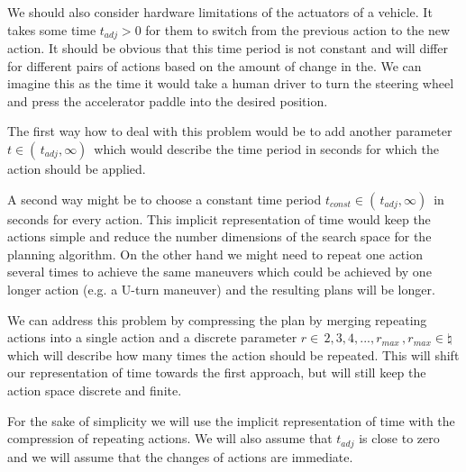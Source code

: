 We should also consider hardware limitations of the actuators of a vehicle. It takes some time $t_{adj} > 0$ for them to switch from the previous action to the new action. It should be obvious that this time period is not constant and will differ for different pairs of actions based on the amount of change in the. We can imagine this as the time it would take a human driver to turn the steering wheel and press the accelerator paddle into the desired position.

The first way how to deal with this problem would be to add another parameter $t \in ( \, t_{adj}, \infty ) \,$ which would describe the time period in seconds for which the action should be applied.

A second way might be to choose a constant time period $t_{const} \in ( \, t_{adj}, \infty ) \,$ in seconds for every action. This implicit representation of time would keep the actions simple and reduce the number dimensions of the search space for the planning algorithm. On the other hand we might need to repeat one action several times to achieve the same maneuvers which could be achieved by one longer action (e.g. a U-turn maneuver) and the resulting plans will be longer.

We can address this problem by compressing the plan by merging repeating actions into a single action and a discrete parameter $r \in { \, 2, 3, 4, ..., r_{max} } \,, r_{max} \in \natural$ which will describe how many times the action should be repeated. This will shift our representation of time towards the first approach, but will still keep the action space discrete and finite.

For the sake of simplicity we will use the implicit representation of time with the compression of repeating actions. We will also assume that $t_{adj}$ is close to zero and we will assume that the changes of actions are immediate.